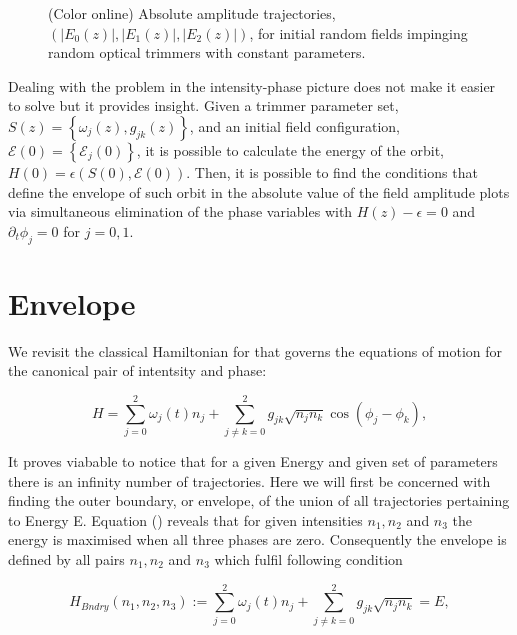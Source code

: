 \documentclass[9pt,twocolumn,twoside]{osajnl}
\begin{document}
\begin{figure}[htbp]
\centering
{}
\caption{(Color online) Absolute amplitude trajectories, $(\vert E_{0}(z) \vert, \vert E_{1}(z) \vert, \vert E_{2}(z) \vert )$, for initial random fields impinging random optical trimmers with constant parameters.}
\label{fig: Fig2}
\end{figure}

Dealing with the problem in the intensity-phase picture does not make it easier to solve but it provides insight.
Given a trimmer parameter set, $S(z) = \left\{ \omega_{j}(z), g_{jk}(z) \right\}$, and an initial field configuration, $\mathcal{E}(0) = \left\{ \mathcal{E}_{j}(0) \right\}$, it is possible to calculate the energy of the orbit, $H(0) = \epsilon\left(S(0), \mathcal{E(0)}\right)$. Then, it is possible to find the conditions that define the envelope of such orbit in the absolute value of the field amplitude plots via simultaneous elimination of the phase variables with $H(z) - \epsilon = 0 $ and $\partial_t \phi_j = 0$ for $j= 0,1$.


\section{Envelope}

We revisit the classical Hamiltonian for that governs the 
equations of motion for the canonical pair of intentsity and 
phase:

\begin{equation} 
H = \sum_{j=0}^{2} \omega_{j}(t) n_{j}  
+ \sum_{j \neq k = 0}^{2} g_{jk} \sqrt{n_{j} n_{k}} \cos \left( \phi_{j} - \phi_{k} \right),\label{eq:clhamm}	
\end{equation}

It proves viabable to notice that for a given Energy and 
given set of parameters there is an infinity number of trajectories.
Here we will first be concerned with finding the outer boundary, or 
envelope, of the union of all trajectories pertaining to Energy 
E. 
Equation (\cite{eq:clhamm}) reveals that for given intensities 
$n_1,n_2$ and $n_3$ the energy is maximised when all three phases
are zero. Consequently the envelope is defined by all pairs
$n_1,n_2$ and $n_3$ which fulfil following condition


\begin{equation}
H_{Bndry}(n_1,n_2,n_3) := \sum_{j=0}^{2} \omega_{j}(t) n_{j}  
+ \sum_{j \neq k = 0}^{2} g_{jk} \sqrt{n_{j} n_{k}} = E,	
\end{equation}
\end{document}

